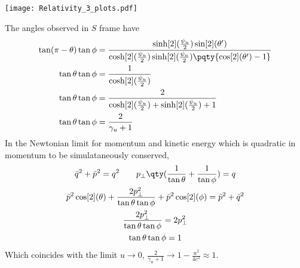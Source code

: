 \documentclass[12pt]{article}
\begin{document}
        \begin{center}
            \texttt{[image: Relativity\_3\_plots.pdf]}
        \end{center}
        The angles observed in $S$ frame have 
        \begin{align*}
            \tan(\pi -\theta) \tan \phi &=  \frac{ \sinh[2](\frac{\psi_u}{2})\sin[2](\theta')}{\cosh[2](\frac{\psi_u}{2})\sinh[2](\frac{\psi_u}{2})\pqty{\cos[2](\theta') - 1}} \\
            \tan\theta \tan \phi &= \frac{ 1}{\cosh[2](\frac{\psi_u}{2})} \\
            \tan\theta \tan \phi &=  \frac{2}{\cosh[2](\frac{\psi_u}{2}) + \sinh[2](\frac{\psi_u}{2}) + 1} \\
            \tan\theta \tan \phi &=  \frac{2}{\gamma_u +1}
        \end{align*}
        In the Newtonian limit for momentum and kinetic energy which is quadratic in momentum to be simulataneously conserved,
        \begin{gather*}
            \bar{q}^2 + \bar{p}^2 = q^2\qquad p_\perp \qty(\frac{1}{\tan\theta} + \frac{1}{\tan\phi}) = q\\
            \bar{p}^2 \cos[2](\theta) + \frac{2p_\perp^2}{\tan\theta \tan \phi} +\bar{p}^2 \cos[2](\phi) = \bar{p}^2 + \bar{q}^2\\
            \frac{2p_\perp^2}{\tan\theta \tan \phi}  = 2p_\perp^2\\
            {\tan\theta \tan \phi}  = 1
        \end{gather*}
        Which coincides with the limit \(u \to 0\), \(\frac{2}{\gamma_u + 1} \to 1 - \frac{u^2}{4c^2} \approx 1\).
\end{document}
